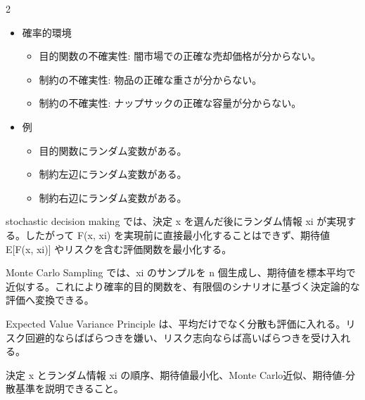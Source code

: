 \clearpage



\vspace{1.5mm}

\begin{multicols}{2}

\footnotesize

\raggedcolumns


\begin{itemize}
\item 確率的環境
\begin{itemize}
\item 目的関数の不確実性: 闇市場での正確な売却価格が分からない。
\item 制約の不確実性: 物品の正確な重さが分からない。
\item 制約の不確実性: ナップサックの正確な容量が分からない。
\end{itemize}
\item 例
\begin{itemize}
\item 目的関数にランダム変数がある。
\item 制約左辺にランダム変数がある。
\item 制約右辺にランダム変数がある。
\end{itemize}
\end{itemize}

stochastic decision making では、決定 x を選んだ後にランダム情報 xi が実現する。したがって F(x, xi) を実現前に直接最小化することはできず、期待値 E[F(x, xi)] やリスクを含む評価関数を最小化する。\par

Monte Carlo Sampling では、xi のサンプルを n 個生成し、期待値を標本平均で近似する。これにより確率的目的関数を、有限個のシナリオに基づく決定論的な評価へ変換できる。\par

Expected Value Variance Principle は、平均だけでなく分散も評価に入れる。リスク回避的ならばばらつきを嫌い、リスク志向ならば高いばらつきを受け入れる。\par

決定 x とランダム情報 xi の順序、期待値最小化、Monte Carlo近似、期待値-分散基準を説明できること。\par


\end{multicols}
